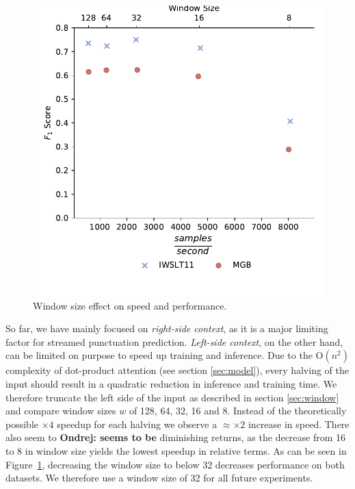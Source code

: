 \documentclass[bsc,deptreport,ai]{infthesis} %
\newcommand{\Ondrej}[1]{{\color{red} \textbf{Ondrej: #1}}}
\begin{document}
\begin{figure}[t]
\centering
\includegraphics[width=.7\textwidth]{winsize(1).pdf}
\caption{Window size effect on speed and performance.}
\label{fig:winsize}
\end{figure}


So far, we have mainly focused on \emph{right-side context}, as it is a major limiting factor for streamed punctuation prediction. \emph{Left-side context}, on the other hand, can be limited on purpose to speed up training and inference. Due to the $\mathrm{O}(n^2)$ complexity of dot-product attention (see section \ref{sec:model}), every halving of the input should result in a quadratic reduction in inference and training time. We therefore truncate the left side of the input as described in section \ref{sec:window} and compare window sizes $w$ of 128, 64, 32, 16 and 8. Instead of the theoretically possible $\times4$ speedup for each halving we observe a $\approx\times2$ increase in speed. There also seem to \Ondrej{seems to be} diminishing returns, as the decrease from 16 to 8 in window size yields the lowest speedup in relative terms. As can be seen in Figure~\ref{fig:winsize}, decreasing the window size to below 32 decreases performance on both datasets. We therefore use a window size of 32 for all future experiments.
\end{document}

